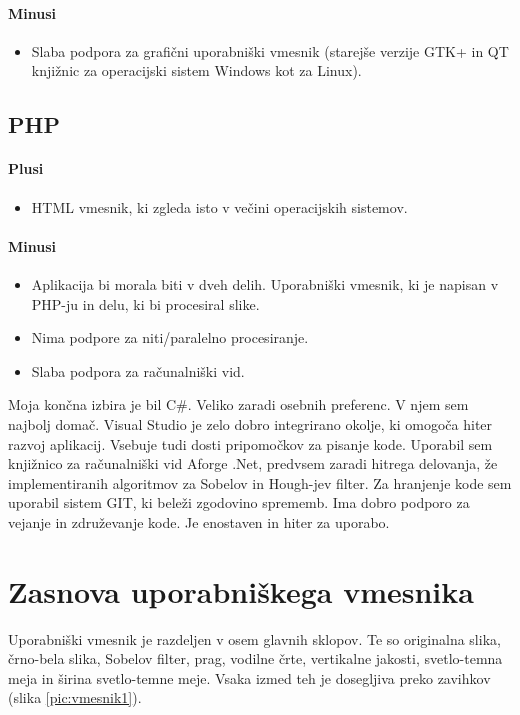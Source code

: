 \documentclass[oneside, a4paper, 12pt]{book}
\begin{document}
\paragraph{Minusi}
\begin{itemize}
\item Slaba podpora za grafični uporabniški vmesnik (starejše verzije GTK+ in QT knjižnic za operacijski sistem Windows kot za Linux).
\end{itemize}

\subsection{PHP}
\paragraph{Plusi}
\begin{itemize}
\item HTML vmesnik, ki zgleda isto v večini operacijskih sistemov.
\end{itemize}
\paragraph{Minusi}
\begin{itemize}
\item Aplikacija bi morala biti v dveh delih. Uporabniški vmesnik, ki je napisan v PHP-ju in delu, ki bi procesiral slike.
\item Nima podpore za niti/paralelno procesiranje.
\item Slaba podpora za računalniški vid.
\end{itemize}

Moja končna izbira je bil C\#. Veliko zaradi osebnih preferenc. V njem sem najbolj domač. Visual Studio je zelo dobro integrirano okolje, ki omogoča hiter razvoj aplikacij. Vsebuje tudi dosti pripomočkov za pisanje kode. 
Uporabil sem knjižnico za računalniški vid Aforge .Net, predvsem zaradi hitrega delovanja, že implementiranih algoritmov za Sobelov in Hough-jev filter.
Za hranjenje kode sem uporabil sistem GIT, ki beleži zgodovino sprememb. Ima dobro podporo za vejanje in združevanje kode. Je enostaven in hiter za uporabo.


\section{Zasnova uporabniškega vmesnika}
Uporabniški vmesnik je razdeljen v osem glavnih sklopov. Te so originalna slika, črno-bela slika, Sobelov filter, prag, vodilne črte, vertikalne jakosti, svetlo-temna meja in širina svetlo-temne meje. Vsaka izmed teh je dosegljiva preko zavihkov (slika \ref{pic:vmesnik1}).
\end{document}
